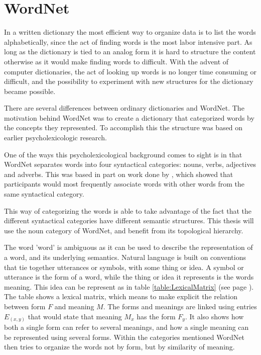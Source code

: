 \section{WordNet}
\label{WordNet}
In a written dictionary the most efficient way to organize data is to list the words alphabetically,
since the act of finding words is the most labor intensive part.
As long as the dictionary is tied to an analog form it is hard to structure the content otherwise as it would make
finding words to difficult.
With the advent of computer dictionaries, the act of looking up words is no longer time consuming or difficult,
and the possibility to experiment with new structures for the dictionary became possible.

There are several differences between ordinary dictionaries and WordNet.
The motivation behind WordNet was to create a dictionary that categorized words by the concepts they represented.
To accomplish this the structure was based on earlier psycholexicologic research\citep{Miller1990}.

One of the ways this psycholexicological background comes to sight is in that WordNet separates words into four syntactical categories: nouns, verbs, adjectives and adverbs\citep{Miller1995}.
This was based in part on work done by \citet{Fillenbaum1965}, which showed that participants would most frequently
associate words with other words from the same syntactical category.

This way of categorizing the words is able to take advantage of the fact that the different syntactical categories have different semantic structures.
This thesis will use the noun category of WordNet, and benefit from its topological hierarchy.

The word 'word' is ambiguous as it can be used to describe the representation of a word, and its underlying semantics.
Natural language is built on conventions that tie together utterances or symbols, with some thing or idea.
A symbol or utterance is the form of a word, while the thing or idea it represents is the words meaning.
This idea can be represent as in table \ref{table:LexicalMatrix} (see page \pageref{table:LexicalMatrix}).
The table shows a lexical matrix, which means to make explicit the relation between form $F$ and meaning $M$.
The forms and meanings are linked using entries $E_{(x,y)}$ that would state that meaning $M_x$ has the form $F_y$.
It also shows how both a single form can refer to several meanings,
and how a single meaning can be represented using several forms.
Within the categories mentioned WordNet then tries to organize the words not by form,
but by similarity of meaning.

